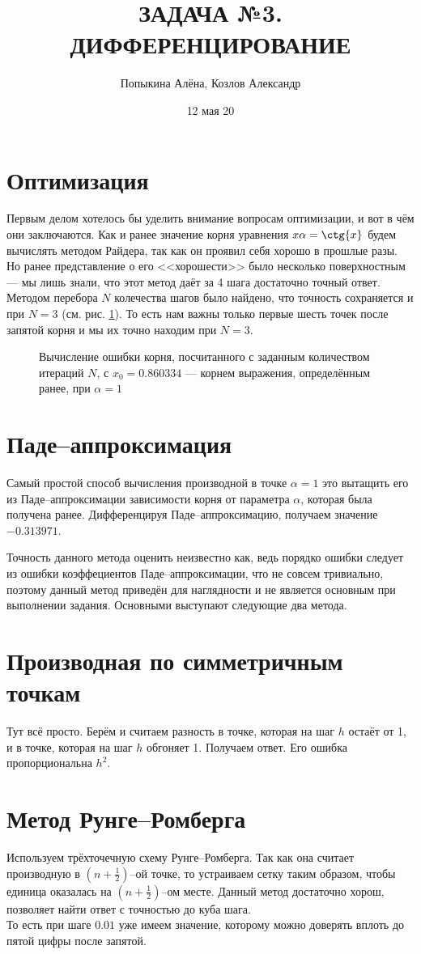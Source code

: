 \documentclass[a4paper,10pt]{article}
\title{ЗАДАЧА №3. ДИФФЕРЕНЦИРОВАНИЕ}
\author{Попыкина Алёна, Козлов Александр}
\date{12 мая 20}
\begin{document}
\maketitle
\section{Оптимизация}
    Первым делом хотелось бы уделить внимание вопросам оптимизации, и вот в чём они заключаются. Как и ранее значение корня уравнения $x \alpha = \ctg{x} $ будем вычислять методом Райдера, так как он проявил себя хорошо в прошлые разы. Но ранее представление о его <<хорошести>> было несколько поверхностным --- мы лишь знали, что этот метод даёт за 4 шага достаточно точный ответ. Методом перебора $N$ колечества шагов было найдено, что точность сохраняется и при $N = 3$ (см. рис. \ref{graph1}). То есть нам важны только первые шесть точек после запятой корня и мы их точно находим при $N = 3$.
    \begin{figure}[h]
        \noindent{}
        \caption{Вычисление ошибки корня, посчитанного с заданным количеством итераций $N$, с $x_0 = 0.860334$ --- корнем выражения, определённым ранее, при $\alpha = 1$ }
        \label{graph1}
    \end{figure} 
\section{Паде--аппроксимация}
    Самый простой способ вычисления производной в точке $\alpha = 1$ это вытащить его из Паде--аппроксимации зависимости корня от параметра $\alpha$, которая была получена ранее. Дифференцируя Паде--аппроксимацию, получаем значение $-0.313971$.\par
    Точность данного метода оценить неизвестно как, ведь порядко ошибки следует из ошибки коэффециентов Паде--аппроксимации, что не совсем тривиально, поэтому данный метод приведён для наглядности и не является основным при выполнении задания. Основными выступают следующие два метода.

\section{Производная по симметричным точкам}
    Тут всё просто. Берём и считаем разность в точке, которая на шаг $h$ остаёт от 1, и в точке, которая на шаг $h$ обгоняет 1. Получаем ответ. Его ошибка пропорциональна $h^2$.
\section{Метод Рунге--Ромберга}
    Используем трёхточечную схему Рунге--Ромберга. Так как она считает производную в $(n + \frac12)$--ой точке, то устраиваем сетку таким образом, чтобы единица оказалась на $(n + \frac12)$--ом месте. Данный метод достаточно хорош, позволяет найти ответ с точностью до куба шага.\\ То есть при шаге $0.01$ уже имеем значение, которому можно доверять вплоть до пятой цифры после запятой.
\end{document}
